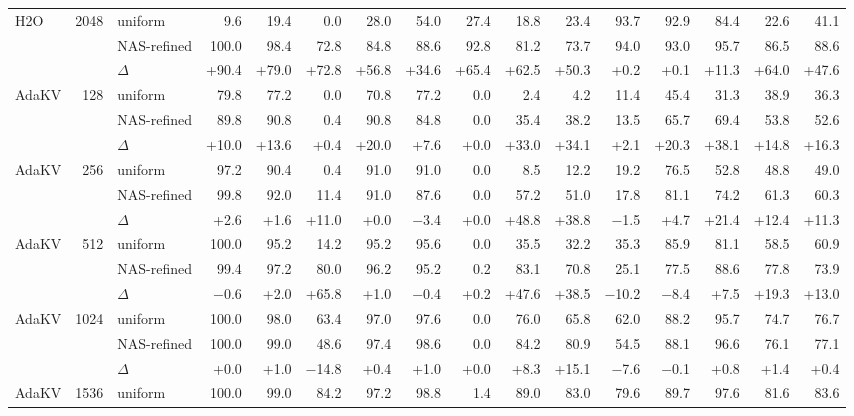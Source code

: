 \begin{table}[tp]
\begin{tabular}{@{}l r l r r r r r r r r r r r r r @{}}
    \midrule
    H2O & 2048 & uniform & 9.6 & 19.4 & 0.0 & 28.0 & 54.0 & 27.4 & 18.8 & 23.4 & 93.7 & 92.9 & 84.4 & 22.6 & 41.1 \\
     &  & NAS-refined & 100.0 & 98.4 & 72.8 & 84.8 & 88.6 & 92.8 & 81.2 & 73.7 & 94.0 & 93.0 & 95.7 & 86.5 & 88.6 \\
     &  & $\Delta$ & +90.4 & +79.0 & +72.8 & +56.8 & +34.6 & +65.4 & +62.5 & +50.3 & +0.2 & +0.1 & +11.3 & +64.0 & +47.6 \\
    \midrule
    AdaKV & 128 & uniform & 79.8 & 77.2 & 0.0 & 70.8 & 77.2 & 0.0 & 2.4 & 4.2 & 11.4 & 45.4 & 31.3 & 38.9 & 36.3 \\
     &  & NAS-refined & 89.8 & 90.8 & 0.4 & 90.8 & 84.8 & 0.0 & 35.4 & 38.2 & 13.5 & 65.7 & 69.4 & 53.8 & 52.6 \\
     &  & $\Delta$ & +10.0 & +13.6 & +0.4 & +20.0 & +7.6 & +0.0 & +33.0 & +34.1 & +2.1 & +20.3 & +38.1 & +14.8 & +16.3 \\
    \midrule
    AdaKV & 256 & uniform & 97.2 & 90.4 & 0.4 & 91.0 & 91.0 & 0.0 & 8.5 & 12.2 & 19.2 & 76.5 & 52.8 & 48.8 & 49.0 \\
     &  & NAS-refined & 99.8 & 92.0 & 11.4 & 91.0 & 87.6 & 0.0 & 57.2 & 51.0 & 17.8 & 81.1 & 74.2 & 61.3 & 60.3 \\
     &  & $\Delta$ & +2.6 & +1.6 & +11.0 & +0.0 & $-$3.4 & +0.0 & +48.8 & +38.8 & $-$1.5 & +4.7 & +21.4 & +12.4 & +11.3 \\
    \midrule
    AdaKV & 512 & uniform & 100.0 & 95.2 & 14.2 & 95.2 & 95.6 & 0.0 & 35.5 & 32.2 & 35.3 & 85.9 & 81.1 & 58.5 & 60.9 \\
     &  & NAS-refined & 99.4 & 97.2 & 80.0 & 96.2 & 95.2 & 0.2 & 83.1 & 70.8 & 25.1 & 77.5 & 88.6 & 77.8 & 73.9 \\
     &  & $\Delta$ & $-$0.6 & +2.0 & +65.8 & +1.0 & $-$0.4 & +0.2 & +47.6 & +38.5 & $-$10.2 & $-$8.4 & +7.5 & +19.3 & +13.0 \\
    \midrule
    AdaKV & 1024 & uniform & 100.0 & 98.0 & 63.4 & 97.0 & 97.6 & 0.0 & 76.0 & 65.8 & 62.0 & 88.2 & 95.7 & 74.7 & 76.7 \\
     &  & NAS-refined & 100.0 & 99.0 & 48.6 & 97.4 & 98.6 & 0.0 & 84.2 & 80.9 & 54.5 & 88.1 & 96.6 & 76.1 & 77.1 \\
     &  & $\Delta$ & +0.0 & +1.0 & $-$14.8 & +0.4 & +1.0 & +0.0 & +8.3 & +15.1 & $-$7.6 & $-$0.1 & +0.8 & +1.4 & +0.4 \\
    \midrule
    AdaKV & 1536 & uniform & 100.0 & 99.0 & 84.2 & 97.2 & 98.8 & 1.4 & 89.0 & 83.0 & 79.6 & 89.7 & 97.6 & 81.6 & 83.6 \\

\end{tabular}
\end{table}
